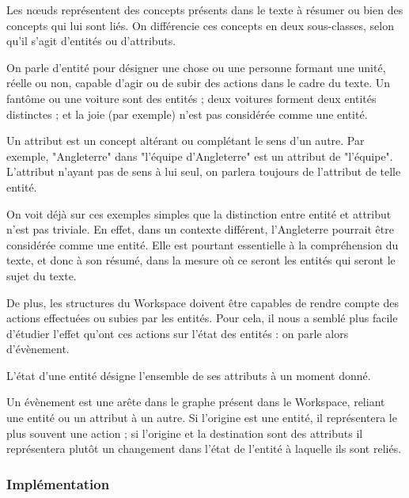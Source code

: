 \documentclass[a4paper, 12pt]{article}
\begin{document}
Les nœuds représentent des concepts présents dans le texte à résumer ou bien des concepts qui lui sont liés. On différencie ces concepts en deux sous-classes, selon qu'il s'agit d'entités ou d'attributs.

\begin{definition}[Entité]
On parle d'entité pour désigner une chose ou une personne formant une unité, réelle ou non, capable d'agir ou de subir des actions dans le cadre du texte. Un fantôme ou une voiture sont des entités ; deux voitures forment deux entités distinctes ; et la joie (par exemple) n'est pas considérée comme une entité.
\end{definition}
\begin{definition}[Attribut]
Un attribut est un concept altérant ou complétant le sens d'un autre. Par exemple, "Angleterre" dans "l'équipe d'Angleterre" est un attribut de "l'équipe". L'attribut n'ayant pas de sens à lui seul, on parlera toujours de l'attribut de telle entité.
\end{definition}

On voit déjà sur ces exemples simples que la distinction entre entité et attribut n'est pas triviale. En effet, dans un contexte différent, l'Angleterre pourrait être considérée comme une entité. Elle est pourtant essentielle à la compréhension du texte, et donc à son résumé, dans la mesure où ce seront les entités qui seront le sujet du texte.

De plus, les structures du Workspace doivent être capables de rendre compte des actions effectuées ou subies par les entités. Pour cela, il nous a semblé plus facile d'étudier l'effet qu'ont ces actions sur l'état des entités : on parle alors d'évènement.

\begin{definition}[État]
L'état d'une entité désigne l'ensemble de ses attributs à un moment donné.
\end{definition}
\begin{definition}[Évènement]
Un évènement est une arête dans le graphe présent dans le Workspace, reliant une entité ou un attribut à un autre. Si l'origine est une entité, il représentera le plus souvent une action ; si l'origine et la destination sont des attributs il représentera plutôt un changement dans l'état de l'entité à laquelle ils sont reliés.
\end{definition}

\subsubsection{Implémentation}
\end{document}
